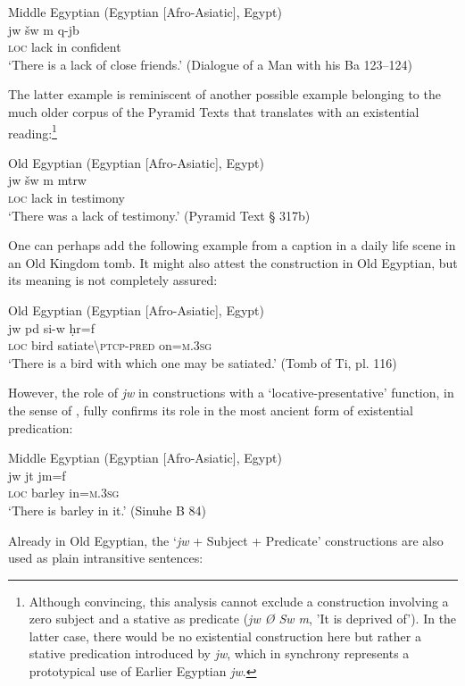 \documentclass[output=paper,draft,draftmode,colorlinks,citecolor=brown]{langscibook}
\begin{document}
\ea Middle Egyptian (Egyptian [Afro-Asiatic], Egypt) \label{ex:AE15}\\
	\gll jw šw m {\ꜥ}q-jb\\
	\textsc{loc} lack in confident\\
	\glt ‘There is a lack of close friends.’ (Dialogue of a Man with his Ba 123–124)
\z 

The latter example is reminiscent of another possible example belonging to the much older corpus of the Pyramid Texts that \citet[333]{Allen2017} translates with an existential reading:\footnote{Although convincing, this analysis cannot exclude a construction involving a zero subject and a stative as predicate (\textit{jw Ø Sw m}, 'It is deprived of’). In the latter case, there would be no existential construction here but rather a stative predication introduced by \textit{jw}, which in synchrony represents a prototypical use of Earlier Egyptian \textit{jw}.}

\ea Old Egyptian (Egyptian [Afro-Asiatic], Egypt) \label{ex:AE16}\\
	\gll jw šw m mtrw\\
	\textsc{loc} lack in testimony\\
	\glt ‘There was a lack of testimony.’ (Pyramid Text § 317b)
\z 

One can perhaps add the following example from a caption in a daily life scene in an Old Kingdom tomb. It might also attest the construction in Old Egyptian, but its meaning is not completely assured:

\ea Old Egyptian (Egyptian [Afro-Asiatic], Egypt) \label{ex:AE17}\\
	\gll jw {\ꜣ}pd s{\ꜣ}i-w ḥr=f\\
	\textsc{loc} bird satiate\textbackslash\textsc{ptcp-pred} on=\textsc{m.3sg}\\
	\glt ‘There is a bird with which one may be satiated.’ (Tomb of Ti, pl. 116)
\z 

However, the role of \textit{jw} in constructions with a ‘locative-presentative’ function, in the sense of \citet{Hengeveld1992}, fully confirms its role in the most ancient form of existential predication:

\ea Middle Egyptian (Egyptian [Afro-Asiatic], Egypt) \label{ex:AE18}\\
	\gll jw jt jm=f\\
	\textsc{loc} barley in=\textsc{m.3sg}\\
	\glt ‘There is barley in it.’ (Sinuhe B 84)
\z 

Already in Old Egyptian, the ‘\textit{jw} + Subject + Predicate’ constructions are also used as plain intransitive sentences: 
\end{document}
